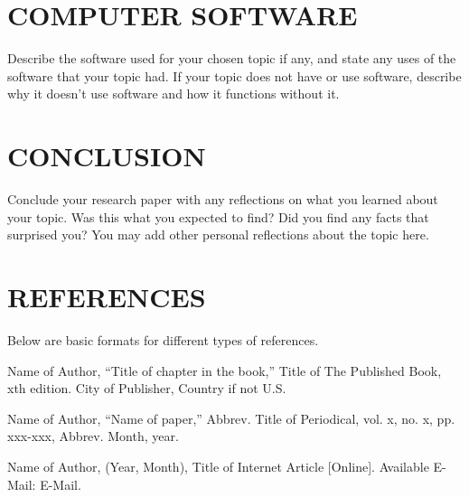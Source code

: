 \documentclass[letterpaper, 10 pt, conference]{IEEEconf}
\begin{document}
\section{COMPUTER SOFTWARE}

Describe the software used for your chosen topic if any,
and state any uses of the software that your topic had.
If your topic does not have or use software, describe why it
doesn't use software and how it functions without it.

\section{CONCLUSION}

Conclude your research paper with any reflections on what you
learned about your topic. Was this what you expected to find?
Did you find any facts that surprised you? You may add other
personal reflections about the topic here.

\section*{REFERENCES}

Below are basic formats for different types of references.

\begin{enumerate}[label={[\arabic*]}]
\item Name of Author, ``Title of chapter in the book,''
Title of The Published Book, xth edition. City of
Publisher, Country if not U.S.
\item Name of Author, “Name of paper,” Abbrev.
Title of Periodical, vol. x, no. x, pp. xxx-xxx,
Abbrev. Month, year.
\item Name of Author, (Year, Month),
Title of Internet Article [Online]. Available E-Mail:
E-Mail.
\end{enumerate}
\end{document}
